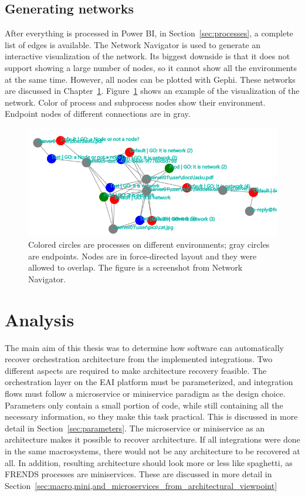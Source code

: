 \documentclass[english, 12pt, a4paper, sci, utf8, a-2b, online, obeyspaces]{aaltothesis}
\begin{document}
\subsection{Generating networks}
After everything is processed in Power BI, in Section~\ref{sec:processes}, a complete list of edges is available. The Network Navigator is used to generate an interactive visualization of the network. Its biggest downside is that it does not support showing a large number of nodes, so it cannot show all the environments at the same time. However, all nodes can be plotted with Gephi. These networks are discussed in Chapter~\ref{sec:analysis}. Figure~\ref{fig:ExampleNetwork} shows an example of the visualization of the network. Color of process and subprocess nodes show their environment. Endpoint nodes of different connections are in gray.

\begin{figure}[htb]
  \centering
      \includegraphics[width=\textwidth]{pictures/network/GS_verkosto_lahikuva.png}
  \caption{Colored circles are processes on different environments; gray circles are endpoints. Nodes are in force-directed layout and they were allowed to overlap. The figure is a screenshot from Network Navigator.}
  \label{fig:ExampleNetwork}
\end{figure}

\clearpage

\section{Analysis}
\label{sec:analysis}
The main aim of this thesis was to determine how software can automatically recover orchestration architecture from the implemented integrations. Two different aspects are required to make architecture recovery feasible. The orchestration layer on the EAI platform must be parameterized, and integration flows must follow a microservice or miniservice paradigm as the design choice. Parameters only contain a small portion of code, while still containing all the necessary information, so they make this task practical. This is discussed in more detail in Section~\ref{sec:parameters}. The microservice or miniservice as an architecture makes it possible to recover architecture. If all integrations were done in the same macrosystems, there would not be any architecture to be recovered at all. In addition, resulting architecture should look more or less like spaghetti, as FRENDS processes are miniservices. These are discussed in more detail in Section~\ref{sec:macro,mini,and_microservices_from_architectural_viewpoint}
\end{document}

